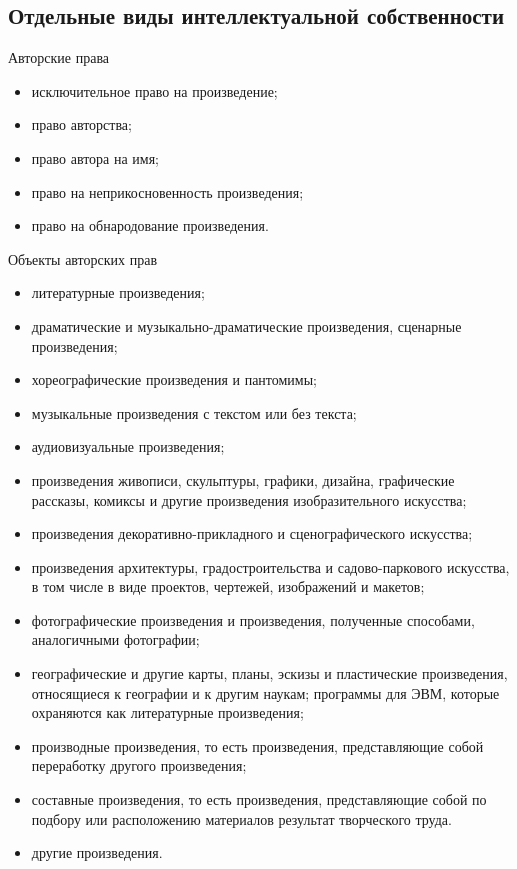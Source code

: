\documentclass[_Venture_p2.tex]{subfiles}
\begin{document}
\subsection{Отдельные виды интеллектуальной собственности}
\begin{frame}{Авторские права}
\begin{itemize}
	\item исключительное право на произведение;
	\item право авторства;
	\item право автора на имя;
	\item право на неприкосновенность произведения;
	\item право на обнародование произведения.
\end{itemize}
\end{frame}
\begin{frame}[ allowframebreaks]{Объекты авторских прав}
\begin{itemize}
	\item литературные произведения;
	\item драматические и музыкально-драматические произведения, сценарные произведения;
	\item хореографические произведения и пантомимы;
	\item музыкальные произведения с текстом или без текста;
	\item аудиовизуальные произведения;
	\pagebreak
	\item произведения живописи, скульптуры, графики, дизайна, графические рассказы, комиксы и другие произведения изобразительного искусства;
	\item произведения декоративно-прикладного и сценографического искусства;
	\item произведения архитектуры, градостроительства и садово-паркового искусства, в том числе в виде проектов, чертежей, изображений и макетов;
	\pagebreak
	\item фотографические произведения и произведения, полученные способами, аналогичными фотографии;
	\item географические и другие карты, планы, эскизы и пластические произведения, относящиеся к географии и к другим наукам;
	программы для ЭВМ, которые охраняются как литературные произведения;
	\pagebreak
	\item производные произведения, то есть произведения, представляющие собой переработку другого произведения;
	\item составные произведения, то есть произведения, представляющие собой по подбору или расположению материалов результат творческого труда.
	\item другие произведения.
	
\end{itemize}
\end{frame}
\end{document}
